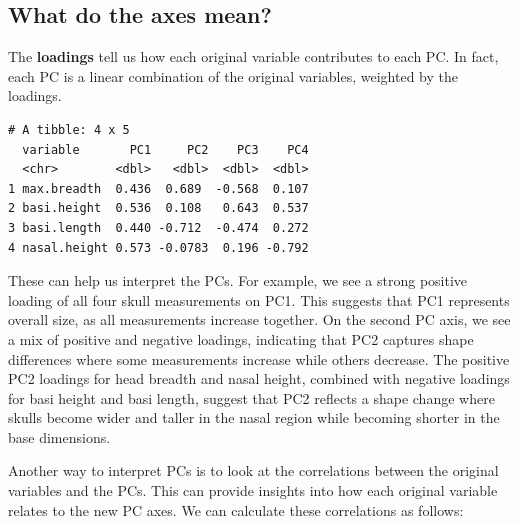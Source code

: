 \documentclass[
  letterpaper,
  8pt,
  a4paper]{book}
\newenvironment{Shaded}{\begin{snugshade}}{\end{snugshade}}
\newcommand{\AttributeTok}[1]{\textcolor[rgb]{0.40,0.45,0.13}{#1}}
\newcommand{\DecValTok}[1]{\textcolor[rgb]{0.68,0.00,0.00}{#1}}
\newcommand{\FunctionTok}[1]{\textcolor[rgb]{0.28,0.35,0.67}{#1}}
\newcommand{\NormalTok}[1]{\textcolor[rgb]{0.00,0.23,0.31}{#1}}
\newcommand{\OtherTok}[1]{\textcolor[rgb]{0.00,0.23,0.31}{#1}}
\newcommand{\SpecialCharTok}[1]{\textcolor[rgb]{0.37,0.37,0.37}{#1}}
\newcommand{\StringTok}[1]{\textcolor[rgb]{0.13,0.47,0.30}{#1}}
\begin{document}
\subsection*{What do the axes mean?}\label{what-do-the-axes-mean}

The \textbf{loadings} tell us how each original variable contributes to
each PC. In fact, each PC is a linear combination of the original
variables, weighted by the loadings.

\begin{Shaded}
\end{Shaded}

\begin{verbatim}
# A tibble: 4 x 5
  variable       PC1     PC2    PC3    PC4
  <chr>        <dbl>   <dbl>  <dbl>  <dbl>
1 max.breadth  0.436  0.689  -0.568  0.107
2 basi.height  0.536  0.108   0.643  0.537
3 basi.length  0.440 -0.712  -0.474  0.272
4 nasal.height 0.573 -0.0783  0.196 -0.792
\end{verbatim}

These can help us interpret the PCs. For example, we see a strong
positive loading of all four skull measurements on PC1. This suggests
that PC1 represents overall size, as all measurements increase together.
On the second PC axis, we see a mix of positive and negative loadings,
indicating that PC2 captures shape differences where some measurements
increase while others decrease. The positive PC2 loadings for head
breadth and nasal height, combined with negative loadings for basi
height and basi length, suggest that PC2 reflects a shape change where
skulls become wider and taller in the nasal region while becoming
shorter in the base dimensions.

Another way to interpret PCs is to look at the correlations between the
original variables and the PCs. This can provide insights into how each
original variable relates to the new PC axes. We can calculate these
correlations as follows:

\begin{Shaded}
\end{Shaded}
\end{document}
